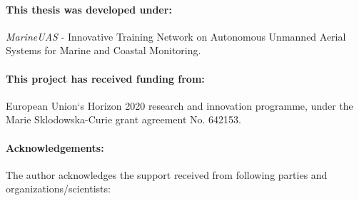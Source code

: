 \paragraph{This thesis was developed under:} \emph{MarineUAS} - Innovative Training Network on Autonomous Unmanned Aerial Systems for Marine and Coastal Monitoring.

\paragraph{This project has received funding from:} European Union`s Horizon 2020 research and innovation programme, under the Marie Sklodowska-Curie grant agreement No. 642153. 

\paragraph{Acknowledgements:} The author acknowledges the support received from following parties and organizations/scientists:


